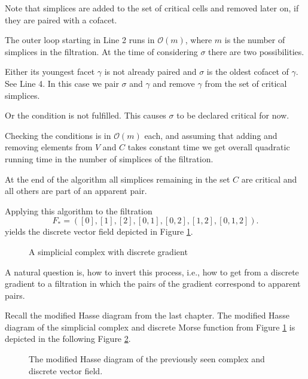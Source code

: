Note that simplices are added to the set of critical cells and removed later on, if they are paired with a cofacet. 

The outer loop starting in Line 2 runs in $\mathcal{O}(m)$, where $m$ is the number of simplices in the filtration. At the time of considering $\sigma$ there are two possibilities.

Either its youngest facet $\gamma$ is not already paired and $\sigma$ is the oldest cofacet of $\gamma$. See Line 4. In this case we pair $\sigma$ and $\gamma$ and remove $\gamma$ from the set of critical simplices. 

Or the condition is not fulfilled. This causes $\sigma$ to be declared critical for now.

Checking the conditions is in $\mathcal{O}(m)$ each, and assuming that adding and removing elements from $V$ and $C$ takes constant time we get overall quadratic running time in the number of simplices of the filtration.

At the end of the algorithm all simplices remaining in the set $C$ are critical and all others are part of an apparent pair.

Applying this algorithm to the filtration \[
   F_* = ([0],[1],[2],[0,1],[0,2],[1,2],[0,1,2]).
\]
yields the discrete vector field depicted in Figure \ref{fig:algo1_example}. 

\begin{figure}[H]
\noindent%

\centering%

\caption{A simplicial complex with discrete gradient}
\label{fig:algo1_example}

\end{figure}


A natural question is, how to invert this process, i.e., how to get from a discrete gradient to a filtration in which the pairs of the gradient correspond to apparent pairs.

Recall the modified Hasse diagram from the last chapter. The modified Hasse diagram of the simplicial complex and discrete Morse function from Figure \ref{fig:algo1_example} is depicted in the following Figure \ref{fig:modified_hasse}. 

\begin{figure}[H]
\noindent%
\centering%

\caption{The modified Hasse diagram of the previously seen complex and discrete vector field.}
\label{fig:modified_hasse}
\end{figure}


